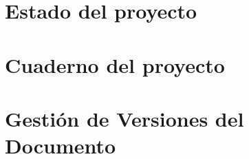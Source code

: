 \documentclass[
    language=spanish,
    school=esdf,
    docstage=final,
    media=paper,
    bookprint=false,
    linkcolor=red!45!black,
    chapterstyle=classic,
    coverstyle=classic,
    aiacknowledgement=true,
    listprefix=false
]{IPLeiriaThesis}
\begin{document}






%
%

\bookmarktocentry\tableofcontents
\listoffigures
\listoftables

\glossarytoc\printnormalglossary
\acronymtoc\printacronymglossary
\symboltoc\printsymbolglossary



\part{Estado del proyecto}




\part{Cuaderno del proyecto}







\part{Gestión de Versiones del Documento}



\end{document}
